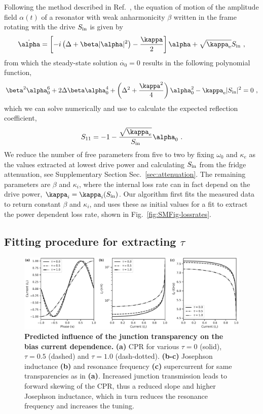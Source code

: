 Following the method described in Ref.~\cite{schmidtCurrentDetectionUsing2020}, the equation of motion of the amplitude field $\alpha(t)$ of a resonator with weak anharmonicity $\beta$ written in the frame rotating with the drive $S_{\rm in}$ is given by
%
\begin{align}
\dot{\alpha} = \left[ -i \left( \Delta+\beta\abs{\alpha}^2 \right)-\frac{\kappa}{2} \right]\alpha + \sqrt{\kappa_\text{e}} S_\text{in}\ ,
\label{eq:Duffing-EOM}
\end{align}
%
from which the steady-state solution $\dot{\alpha_0}=0$ results in the following polynomial function,
% 
\begin{align}
\beta^2 \alpha_0^6 + 2\Delta\beta\alpha_0^4 + \left(\Delta^2+\frac{\kappa^2}{4}\right)\alpha_0^2 - \kappa_\text{e} \abs{S_{\rm in}}^2 = 0\ ,
\label{eq:polynom}
\end{align}
%
which we can solve numerically and use to calculate the expected reflection coefficient,
\begin{align}
S_{11}=-1-\frac{\sqrt{\kappa_e}}{S_{\rm in}}\alpha_0\ .
\label{eq:S11anh}
\end{align}
%
We reduce the number of free parameters from five to two by fixing $\omega_0$ and $\kappa_e$ as the values extracted at lowest drive power and calculating $S_{\rm in}$ from the fridge attenuation, see Supplementary Section Sec.~\ref{sec:attenuation}.
%
The remaining parameters are $\beta$ and $\kappa_i$, where the internal loss rate can in fact depend on the drive power, $\kappa_i=\kappa_i(S_{\rm in})$.
%
Our algorithm first fits the measured data to return constant $\beta$ and $\kappa_i$, and uses these as initial values for a fit to extract the power dependent loss rate, shown in Fig.~\ref{fig:SMFig-lossrates}.

\subsection{Fitting procedure for extracting $\tau$}

\begin{figure}
	\centering
	\includegraphics[width=\linewidth]{chapter-gJJ-CPR/figs/SMFigure-influence}
	\caption{
		\textbf{Predicted influence of the junction transparency on the bias current dependence.}
		\textbf{(a)} CPR for various $\tau=0$ (solid), $\tau=0.5$ (dashed) and $\tau=1.0$	(dash-dotted).
		\textbf{(b-c)} Josephson inductance \textbf{(b)} and resonance frequency \textbf{(c)} supercurrent for	same transparencies as in \textbf{(a)}.
		Increased junction transmission leads to forward skewing of the CPR, thus a reduced slope and higher Josephson inductance, which in turn reduces the resonance frequency and increases the tuning.
	}
	\label{fig:SMinfluence}
\end{figure}

